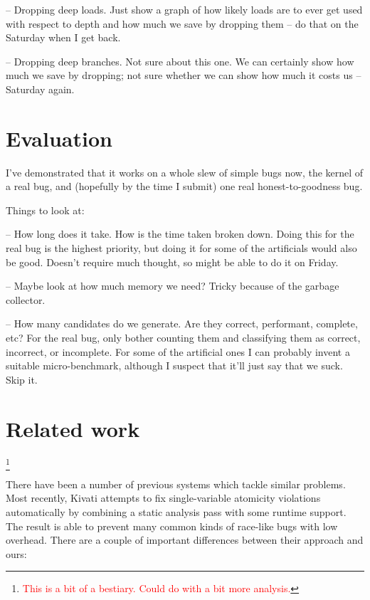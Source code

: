 \documentclass[10pt,twocolumn,preprint,natbib,authoryear]{sigplanconf}
\newcommand{\editorial}[1]{\textcolor{red}{\footnote{\textcolor{red}{#1}}}}
\begin{document}
-- Dropping deep loads.  Just show a graph of how likely loads are to
ever get used with respect to depth and how much we save by dropping
them -- do that on the Saturday when I get back.

-- Dropping deep branches.  Not sure about this one.  We can certainly
show how much we save by dropping; not sure whether we can show how
much it costs us -- Saturday again.

\section{Evaluation}

I've demonstrated that it works on a whole slew of simple bugs now,
the kernel of a real bug, and (hopefully by the time I submit) one
real honest-to-goodness bug.

Things to look at:

-- How long does it take.  How is the time taken broken down.  Doing
this for the real bug is the highest priority, but doing it for some
of the artificials would also be good.  Doesn't require much thought,
so might be able to do it on Friday.

-- Maybe look at how much memory we need?  Tricky because of the
garbage collector.

-- How many candidates do we generate.  Are they correct, performant,
complete, etc?  For the real bug, only bother counting them and
classifying them as correct, incorrect, or incomplete.  For some of
the artificial ones I can probably invent a suitable micro-benchmark,
although I suspect that it'll just say that we suck.  Skip it.

\section{Related work}\editorial{This is a bit of a bestiary.  Could do with a bit more analysis.}

There have been a number of previous systems which tackle similar
problems.  Most recently, Kivati\cite{Chew2010a} attempts to fix
single-variable atomicity violations automatically by combining a
static analysis pass with some runtime support.  The result is able to
prevent many common kinds of race-like bugs with low overhead.  There
are a couple of important differences between their approach and ours:
\end{document}
